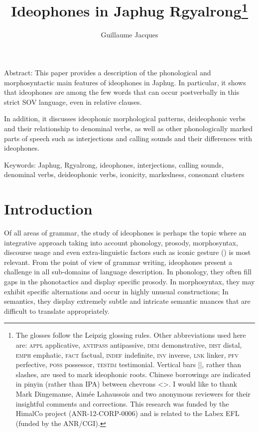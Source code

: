 \documentclass[oldfontcommands,oneside,a4paper,11pt]{article}
\begin{document}
 
 \title{Ideophones in Japhug Rgyalrong\footnote{
The glosses follow the Leipzig glossing rules. Other abbreviations used here are: \textsc{appl} applicative, \textsc{antipass} antipassive,  \textsc{dem} demonstrative, \textsc{dist} distal, \textsc{emph} emphatic, \textsc{fact} factual, \textsc{indef} indefinite, \textsc{inv} inverse,  \textsc{lnk} linker, \textsc{pfv} perfective, \textsc{poss} possessor, \textsc{testim} testimonial.  Vertical bars ||, rather than slashes, are used to mark ideophonic roots. Chinese borrowings are indicated in pinyin (rather than IPA) between chevrons <>.
I would like to thank Mark Dingemanse, Aimée Lahaussois and two anonymous reviewers for their insightful comments and corrections. This research was funded by the HimalCo project (ANR-12-CORP-0006) and is related to the Labex EFL (funded by the ANR/CGI).
} }
\author{Guillaume Jacques}
\maketitle

 
Abstract: This paper provides a   description of the phonological and morphosyntactic main features of ideophones in Japhug. In particular, it shows that ideophones are among the few words that can occur postverbally in this strict SOV language, even in relative clauses.

In addition, it discusses  ideophonic morphological patterns, deideophonic verbs and their relationship to   denominal verbs, as well as other phonologically marked parts of speech such as interjections and calling sounds and their differences with ideophones.

Keywords: Japhug, Rgyalrong, ideophones, interjections, calling sounds, denominal verbs, deideophonic verbs, iconicity, markedness, consonant clusters


 \section{Introduction}
Of all areas of grammar, the study of ideophones is perhaps the   topic where an integrative approach taking into account phonology, prosody, morphosyntax, discourse usage and even extra-linguistic factors such as iconic gesture (\citealt{dingemanse11phd}) is most relevant. From the point of view of grammar writing, ideophones present a challenge in all sub-domains of language description. In phonology, they often fill gaps in the phonotactics and display specific prosody. In morphosyntax, they may exhibit specific alternations and occur in highly unusual constructions; In semantics, they display extremely subtle and intricate semantic nuances that are   difficult to translate appropriately.
\end{document}
